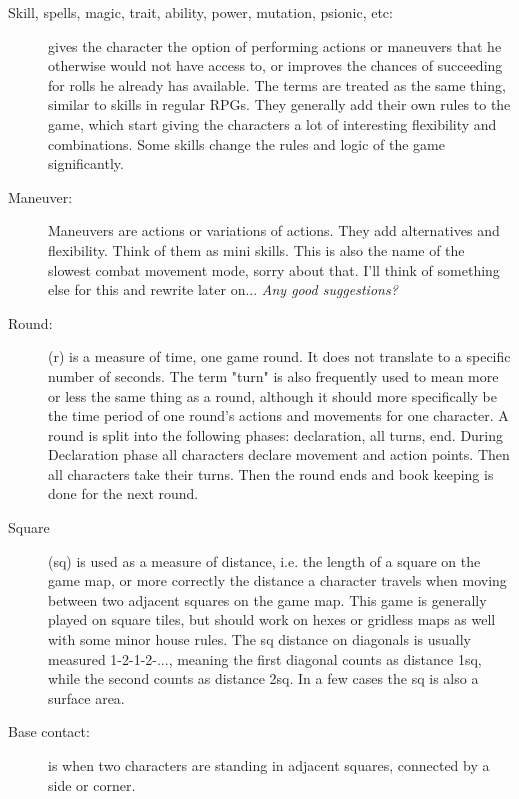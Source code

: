\begin{description}
\item[Skill, spells, magic, trait, ability, power, mutation, psionic, etc:] gives the character the option of performing actions or maneuvers that he otherwise would not have access to, or improves the chances of succeeding for rolls he already has available. The terms are treated as the same thing, similar to skills in regular RPGs. They generally add their own rules to the game, which start giving the characters a lot of interesting flexibility and combinations. Some skills change the rules and logic of the game significantly.

\item[Maneuver:] Maneuvers are actions or variations of actions. They add alternatives and flexibility. Think of them as mini skills.
This is also the name of the slowest combat movement mode, sorry about that. I'll think of something else for this and rewrite later on... \emph{Any good suggestions?}

\item[Round:] (r) is a measure of time, one game round. It does not translate to a specific number of seconds. The term "turn" is also frequently used to mean more or less the same thing as a round, although it should more specifically be the time period of one round's actions and movements for one character.
A round is split into the following phases: declaration, all turns, end.
During Declaration phase all characters declare movement and action points. Then all characters take their turns. Then the round ends and book keeping is done for the next round.

\item[Square] (sq) is used as a measure of distance, i.e. the length of a square on the game map, or more correctly the distance a character travels when moving between two adjacent squares on the game map. This game is generally played on square tiles, but should work on hexes or gridless maps as well with some minor house rules.
The sq distance on diagonals is usually measured 1-2-1-2-..., meaning the first diagonal counts as distance 1sq, while the second counts as distance 2sq.
In a few cases the sq is also a surface area.

\item[Base contact:] is when two characters are standing in adjacent squares, connected by a side or corner.

\end{description}









